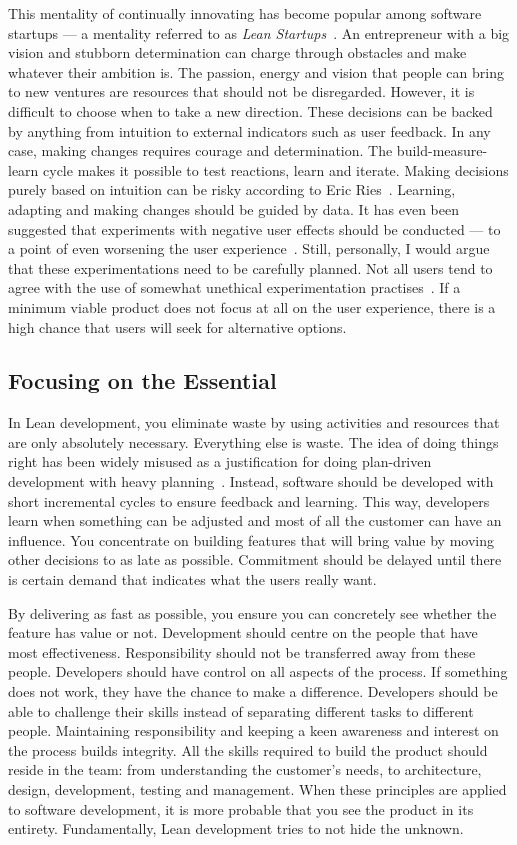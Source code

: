 \documentclass[english]{tktltiki2}
\begin{document}
This mentality of continually innovating has become popular among software startups — a mentality referred to as \emph{Lean Startups}~\cite{Rie11}. An entrepreneur with a big vision and stubborn determination can charge through obstacles and make whatever their ambition is. The passion, energy and vision that people can bring to new ventures are resources that should not be disregarded. However, it is difficult to choose when to take a new direction. These decisions can be backed by anything from intuition to external indicators such as user feedback. In any case, making changes requires courage and determination. The build-measure-learn cycle makes it possible to test reactions, learn and iterate. Making decisions purely based on intuition can be risky according to Eric Ries~\cite{Rie11}. Learning, adapting and making changes should be guided by data. It has even been suggested that experiments with negative user effects should be conducted — to a point of even worsening the user experience~\cite{KLS09, KDF12, Bos12}. Still, personally, I would argue that these experimentations need to be carefully planned. Not all users tend to agree with the use of somewhat unethical experimentation practises~\cite{RM13}. If a minimum viable product does not focus at all on the user experience, there is a high chance that users will seek for alternative options.

\subsection{Focusing on the Essential}

In Lean development, you eliminate waste by using activities and resources that are only absolutely necessary. Everything else is waste. The idea of doing things right has been widely misused as a justification for doing plan-driven development with heavy planning~\cite{Pop02}. Instead, software should be developed with short incremental cycles to ensure feedback and learning. This way, developers learn when something can be adjusted and most of all the customer can have an influence. You concentrate on building features that will bring value by moving other decisions to as late as possible. Commitment should be delayed until there is certain demand that indicates what the users really want.

By delivering as fast as possible, you ensure you can concretely see whether the feature has value or not. Development should centre on the people that have most effectiveness. Responsibility should not be transferred away from these people. Developers should have control on all aspects of the process. If something does not work, they have the chance to make a difference. Developers should be able to challenge their skills instead of separating different tasks to different people. Maintaining responsibility and keeping a keen awareness and interest on the process builds integrity. All the skills required to build the product should reside in the team: from understanding the customer’s needs, to architecture, design, development, testing and management. When these principles are applied to software development, it is more probable that you see the product in its entirety. Fundamentally, Lean development tries to not hide the unknown.
\end{document}
